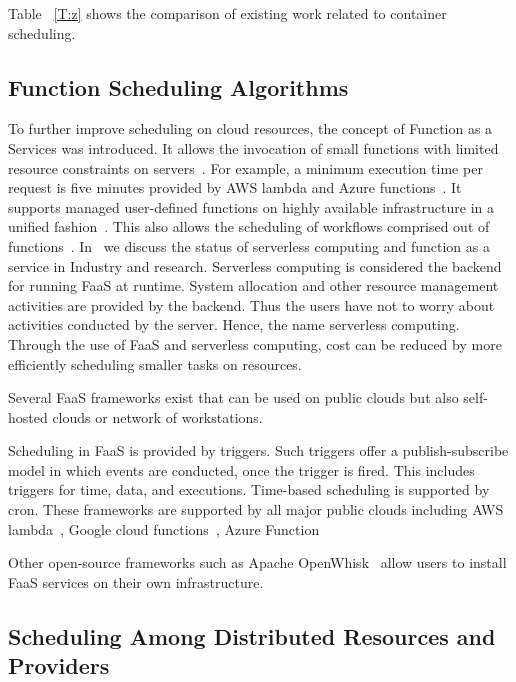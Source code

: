 \documentclass[final,5p,times,twocolumn]{elsarticle}
\begin{document}
Table ~\ref{T:z} shows the comparison of existing work related to container scheduling.




%






\subsection{Function Scheduling Algorithms}
\label{sec:faas}



To further improve scheduling on cloud resources, the concept of Function as a Services was introduced. It allows the invocation of small functions with limited resource constraints on servers~\cite{lasbook}. For example, a minimum execution time per request is five minutes provided by AWS lambda and Azure functions~\cite{ServerlessComputing2018}. It supports managed user-defined functions on highly available infrastructure in a unified fashion~\cite{nastic2017serverless}. This also allows the scheduling of workflows comprised out of functions~\cite{alqaryouti2018serverless}. In~\cite{fox2017status} we discuss the status of serverless computing and function as a service in Industry and research. Serverless computing is considered the backend for running FaaS at runtime. System allocation and other resource management activities are provided by the backend. Thus the users have not to worry about activities conducted by the server. Hence, the name serverless computing. Through the use of FaaS and serverless computing, cost can be reduced by more efficiently scheduling smaller tasks on resources.

Several FaaS frameworks exist that can be used on public clouds but also self-hosted clouds or network of workstations.

Scheduling in FaaS is provided by triggers. Such triggers offer a publish-subscribe model in which events are conducted, once the trigger is fired. This includes triggers for time, data, and executions. Time-based scheduling is supported by cron. These frameworks are supported by all major public clouds including AWS lambda~\cite{AWSlambda2018}, Google cloud functions~\cite{GoogleCF2018}, Azure Function~\cite{Azure2018}

Other open-source frameworks such as Apache OpenWhisk~\cite{OpenWhisk2018} allow users to install FaaS services on their own infrastructure.


\subsection{Scheduling Among Distributed Resources and Providers}
\label{sec:distributed}
\end{document}
